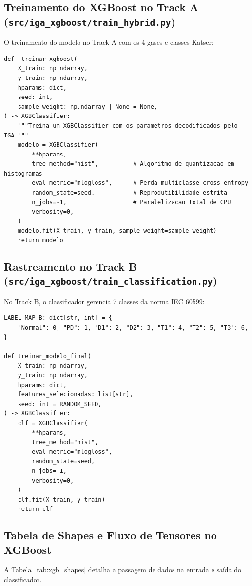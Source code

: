 \documentclass[11pt,a4paper]{article}
\begin{document}
\subsection{Treinamento do XGBoost no Track A (\texttt{src/iga\_xgboost/train\_hybrid.py})}
O treinamento do modelo no Track A com os 4 gases e classes Katser:

\begin{lstlisting}
def _treinar_xgboost(
    X_train: np.ndarray,
    y_train: np.ndarray,
    hparams: dict,
    seed: int,
    sample_weight: np.ndarray | None = None,
) -> XGBClassifier:
    """Treina um XGBClassifier com os parametros decodificados pelo IGA."""
    modelo = XGBClassifier(
        **hparams,
        tree_method="hist",          # Algoritmo de quantizacao em histogramas
        eval_metric="mlogloss",      # Perda multiclasse cross-entropy
        random_state=seed,           # Reprodutibilidade estrita
        n_jobs=-1,                   # Paralelizacao total de CPU
        verbosity=0,
    )
    modelo.fit(X_train, y_train, sample_weight=sample_weight)
    return modelo
\end{lstlisting}

\subsection{Rastreamento no Track B (\texttt{src/iga\_xgboost/train\_classification.py})}
No Track B, o classificador gerencia 7 classes da norma IEC 60599:

\begin{lstlisting}
LABEL_MAP_B: dict[str, int] = {
    "Normal": 0, "PD": 1, "D1": 2, "D2": 3, "T1": 4, "T2": 5, "T3": 6,
}

def treinar_modelo_final(
    X_train: np.ndarray,
    y_train: np.ndarray,
    hparams: dict,
    features_selecionadas: list[str],
    seed: int = RANDOM_SEED,
) -> XGBClassifier:
    clf = XGBClassifier(
        **hparams,
        tree_method="hist",
        eval_metric="mlogloss",
        random_state=seed,
        n_jobs=-1,
        verbosity=0,
    )
    clf.fit(X_train, y_train)
    return clf
\end{lstlisting}

\subsection{Tabela de Shapes e Fluxo de Tensores no XGBoost}
A Tabela~\ref{tab:xgb_shapes} detalha a passagem de dados na entrada e saída do classificador.
\end{document}
